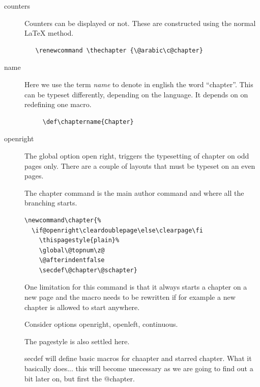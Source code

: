 \documentclass{book}
\begin{document}
\begin{description}
\item [counters] Counters can be displayed or not. These are constructed using the normal LaTeX method.
   \begin{verbatim}
   \renewcommand \thechapter {\@arabic\c@chapter}
   \end{verbatim}

\item [name] Here we use the term \textit{name} to denote in english the word ``chapter''. This can be typeset differently, depending on the language. It depends on on redefining one macro.
   \begin{verbatim}
     \def\chaptername{Chapter}
   \end{verbatim}
\item [openright] The global option open right, triggers the typesetting of chapter on odd pages only. There are a  couple of layouts that must be typeset on an even pages.

\item [\string\chapter] The chapter command is the main author command and where all the branching starts.
    \begin{verbatim}
\newcommand\chapter{%
  \if@openright\cleardoublepage\else\clearpage\fi
    \thispagestyle{plain}%
    \global\@topnum\z@
    \@afterindentfalse
    \secdef\@chapter\@schapter}
    \end{verbatim}

One limitation for this command is that it always starts a chapter on a new page and the macro needs to be rewritten if for example a new chapter is allowed to start anywhere.

Consider options openright, openleft, continuous.

The pagestyle is also settled here.

secdef will define basic macros for chaapter and starred chapter. What it basically does... this will become unecessary as we are going to find out a bit later on, but first the @chapter.


\end{description}
\end{document}
